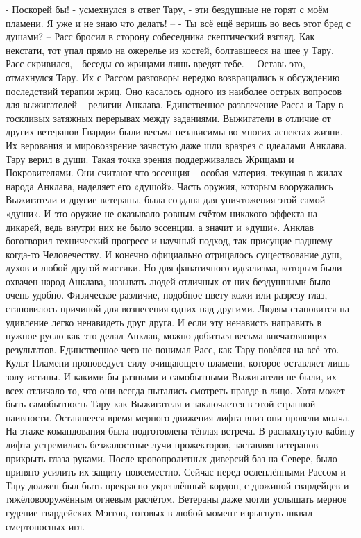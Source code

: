 \documentclass[a4paper, 12pt]{report}
\begin{document}
- Поскорей бы! - усмехнулся в ответ Тару, - эти бездушные не горят с моём пламени. Я уже и не знаю что делать! –
- Ты всё ещё веришь во весь этот бред с душами? – Расс бросил в сторону собеседника скептический взгляд. Как некстати, тот упал прямо на ожерелье из костей, болтавшееся на шее у Тару. Расс скривился, - беседы со жрицами лишь вредят тебе.-
- Оставь это, -  отмахнулся Тару. Их с Рассом разговоры нередко возвращались к обсуждению последствий терапии жриц. Оно касалось одного из наиболее острых вопросов для выжигателей – религии Анклава. Единственное развлечение Расса и Тару в тоскливых затяжных перерывах между заданиями. 
Выжигатели в отличие от других ветеранов Гвардии были весьма независимы во многих аспектах жизни. Их верования и мировоззрение зачастую даже шли вразрез с идеалами Анклава. Тару верил в души. Такая точка зрения поддерживалась Жрицами и Покровителями. Они считают что эссенция – особая материя, текущая в жилах народа Анклава, наделяет его «душой». Часть оружия, которым вооружались Выжигатели и другие ветераны, была создана для уничтожения этой самой «души». И это оружие не оказывало ровным счётом никакого эффекта на дикарей, ведь внутри них не было эссенции, а значит и «души». Анклав боготворил технический прогресс и научный подход, так присущие падшему когда-то Человечеству. И конечно официально отрицалось существование душ, духов и любой другой мистики. Но для фанатичного идеализма, которым были охвачен народ Анклава, называть людей отличных от них бездушными было очень удобно. Физическое различие, подобное цвету кожи или разрезу глаз, становилось причиной для  вознесения одних над другими. Людям становится на удивление легко ненавидеть друг друга. И если эту ненависть направить в нужное русло как это делал Анклав, можно добиться весьма впечатляющих результатов. 
Единственное чего не понимал Расс, как Тару повёлся на всё это. Культ Пламени проповедует силу очищающего пламени, которое оставляет лишь золу истины. И какими бы разными и самобытными Выжигатели не были, их всех отличало то, что они всегда пытались смотреть правде в лицо. Хотя может быть самобытность Тару как Выжигателя и заключается в этой странной наивности.
Оставшееся время мерного движения лифта вниз они провели молча.
На этаже командования была подготовлена тёплая встреча. В распахнутую кабину лифта устремились безжалостные лучи прожекторов, заставляя ветеранов прикрыть глаза руками. 
После кровопролитных диверсий баз на Севере, было принято усилить их защиту повсеместно. Сейчас перед ослеплёнными Рассом и Тару должен был быть прекрасно укреплённый кордон, с дюжиной гвардейцев и тяжёловооружённым огневым расчётом. Ветераны даже могли услышать мерное гудение гвардейских Мэггов, готовых в любой момент изрыгнуть шквал смертоносных игл.
\end{document}
